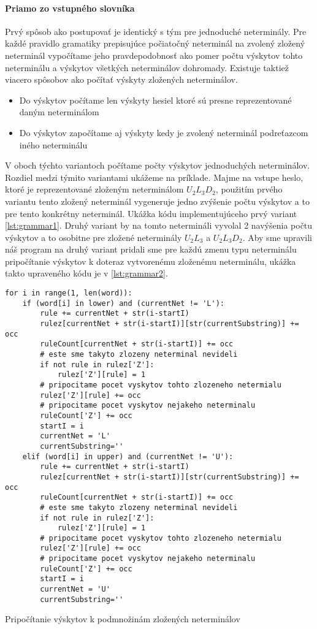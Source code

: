 \paragraph{Priamo zo vstupného slovníka}
Prvý spôsob ako postupovať je identický s tým pre jednoduché neterminály. Pre každé pravidlo gramatiky prepisujúce počiatočný neterminál na zvolený zložený neterminál vypočítame jeho pravdepodobnosť ako pomer počtu výskytov tohto neterminálu a výskytov všetkých neterminálov dohromady. Existuje taktiež viacero spôsobov ako počítať výskyty zložených neterminálov.
\begin{itemize}
	\item Do výskytov počítame len výskyty hesiel ktoré sú presne reprezentované daným neterminálom
	\item Do výskytov započítame aj výskyty kedy je zvolený neterminál podreťazcom iného neterminálu
\end{itemize}
V oboch týchto variantoch počítame počty výskytov jednoduchých neterminálov. Rozdiel medzi týmito variantami ukážeme na príklade. Majme na vstupe heslo, ktoré je reprezentované zloženým neterminálom \(U_2L_3D_2\), použitím prvého variantu tento zložený neterminál vygeneruje jedno zvýšenie počtu výskytov a to pre tento konkrétny neterminál. Ukážka kódu implementujúceho prvý variant \ref{lst:grammar1}. Druhý variant by na tomto netermináli vyvolal 2 navýšenia počtu výskytov a to osobitne pre zložené neterminály \(U_2L_3\) a \(U_2L_3D_2\). Aby sme upravili náš program na druhý variant pridali sme pre každú zmenu typu neterminálu pripočítanie výskytov k doteraz vytvorenému zloženému neterminálu, ukážka takto upraveného kódu je v \ref{lst:grammar2}.

\begin{listing}
\begin{verbatim}
for i in range(1, len(word)):
	if (word[i] in lower) and (currentNet != 'L'):
		rule += currentNet + str(i-startI)
		rulez[currentNet + str(i-startI)][str(currentSubstring)] += occ
		ruleCount[currentNet + str(i-startI)] += occ
		# este sme takyto zlozeny neterminal nevideli
		if not rule in rulez['Z']:
			rulez['Z'][rule] = 1
		# pripocitame pocet vyskytov tohto zlozeneho netermialu
		rulez['Z'][rule] += occ
		# pripocitame pocet vyskytov nejakeho neterminalu
		ruleCount['Z'] += occ
		startI = i
		currentNet = 'L'
		currentSubstring=''
	elif (word[i] in upper) and (currentNet != 'U'):
		rule += currentNet + str(i-startI)
		rulez[currentNet + str(i-startI)][str(currentSubstring)] += occ
		ruleCount[currentNet + str(i-startI)] += occ
		# este sme takyto zlozeny neterminal nevideli
		if not rule in rulez['Z']:
			rulez['Z'][rule] = 1
		# pripocitame pocet vyskytov tohto zlozeneho netermialu
		rulez['Z'][rule] += occ
		# pripocitame pocet vyskytov nejakeho neterminalu
		ruleCount['Z'] += occ
		startI = i
		currentNet = 'U'
		currentSubstring=''
\end{verbatim}
\caption{Pripočítanie výskytov k podmnožinám zložených neterminálov}
\label{lst:grammar2}
\end{listing}

